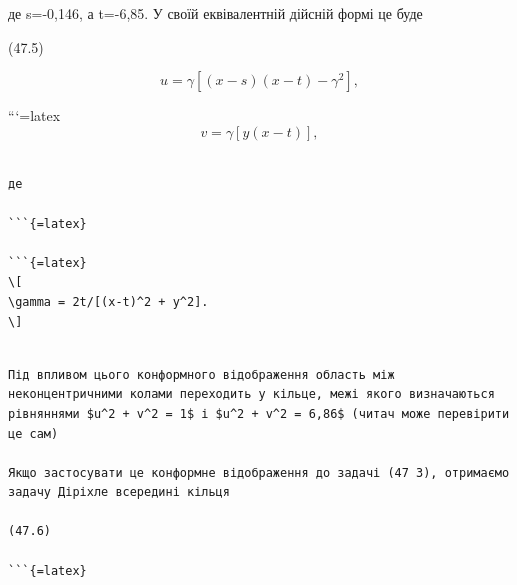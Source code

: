 \documentclass[
]{article}
\begin{document}
де s=-0,146, а t=-6,85. У своїй еквівалентній дійсній формі це буде

(47.5)

\[
u = \gamma [(x-s)(x-t)-\gamma^2],
\]

```{=latex}
\[
v = \gamma [y(x-t)],
\]

\begin{verbatim}

де

```{=latex}

```{=latex}
\[
\gamma = 2t/[(x-t)^2 + y^2].
\]
\end{verbatim}

\begin{verbatim}

Під впливом цього конформного відображення область між неконцентричними колами переходить у кільце, межі якого визначаються рівняннями $u^2 + v^2 = 1$ і $u^2 + v^2 = 6,86$ (читач може перевірити це сам)

Якщо застосувати це конформне відображення до задачі (47 3), отримаємо задачу Діріхле всередині кільця

(47.6)

```{=latex}


\end{verbatim}
\end{document}
